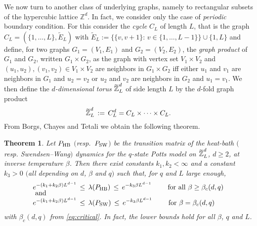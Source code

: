 \documentclass{dis}
\newtheorem{theorem}{Theorem}[chapter]
\theoremstyle{citing}
\begin{document}
We now turn to another class of underlying graphs, namely to 
rectangular subsets of the hypercubic lattice ${\ensuremath{\mathbb{Z}}}^d$. 
In fact, we consider only the case of \emph{periodic} 
boundary condition. For this consider the 
\emph{cycle} 
$C_L$ of length $L$, that is the 
graph $C_L=(\{1,\dots,L\},{\widetilde{{E}}}_L)$ with 
${\widetilde{{E}}}_L:=\bigl\{\{v,v+1\}:\,v\in\{1,\dots,L-1\}\bigr\}
\cup\{1,L\}$ and define, for two graphs $G_1=(V_1,E_1)$ and 
$G_2=(V_2,E_2)$, the 
\emph{graph product}
of $G_1$ and $G_2$, 
written $G_1\times G_2$, as the graph with vertex set 
$V_1\times V_2$ and $(u_1,u_2),(v_1,v_2)\in V_1\times V_2$ 
are neighbors in $G_1\times G_2$ iff either $u_1$ and $v_1$ 
are neighbors in $G_1$ and $u_2=v_2$ or $u_2$ and $v_2$ are 
neighbors in $G_2$ and $u_1=v_1$.
We then define the \emph{$d$-dimensional torus} 
${\raisebox{2pt}{ ${\widetilde{{}}}$ }\mkern-12mu {\ensuremath{\mathbb{Z}}}}_L^d$ 
of side length $L$ by the $d$-fold graph product
\begin{equation}\label{eq:def-torus}
{\raisebox{2pt}{ ${\widetilde{{}}}$ }\mkern-12mu {\ensuremath{\mathbb{Z}}}}_L^d \,:=\, C_L^d = C_L\times \dots \times C_L.
\end{equation}
From Borgs, Chayes and Tetali \cite{BCT} we obtain the following 
theorem.

\begin{theorem}\label{th:P-SW-HB_torus}
Let ${P_{\rm HB}}$ $($resp.~${P_{\rm SW}}$$)$ be the transition matrix of the heat-bath 
$($resp. Swendsen--Wang$)$ dynamics for the $q$-state Potts model 
on ${\raisebox{2pt}{ ${\widetilde{{}}}$ }\mkern-12mu {\ensuremath{\mathbb{Z}}}}_L^d$, $d\ge2$, at inverse temperature $\beta$. 
Then there exist constants $k_1,k_2<\infty$ 
and a constant $k_3>0$ 
$($all depending on $d$, $\beta$ and $q$$)$
such that, for $q$ and $L$ large enough, 
\begin{align*}
e^{-(k_1 + k_2 \beta) L^{d-1}} \,&\le\, \lambda({P_{\rm HB}}) 
	\,\le\, e^{-k_3 \beta L^{d-1}} \qquad 
	\text{ for all } \beta\ge\beta_c(d,q) \\[-3mm]
\intertext{\vspace*{-1mm} and}
e^{-(k_1 + k_2 \beta) L^{d-1}} \,&\le\, \lambda({P_{\rm SW}}) 
	\,\le\, e^{-k_3 \beta L^{d-1}} \qquad 	
	\text{ for } \beta=\beta_c(d,q)
\end{align*}
with $\beta_c(d,q)$ from \eqref{eq:critical}. 
In fact, the lower bounds hold for all $\beta$, $q$ and $L$. 
\end{theorem}
\end{document}
